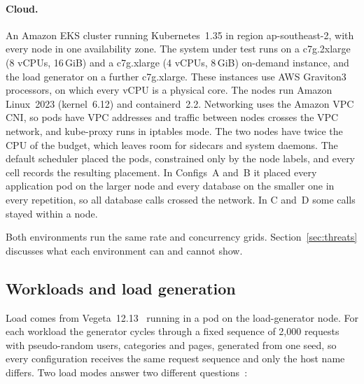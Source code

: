 \paragraph{Cloud.} An Amazon EKS cluster running Kubernetes~1.35 in region ap-southeast-2, with every node in
one availability zone. The system under test runs on a c7g.2xlarge (8 vCPUs, 16\,GiB) and a c7g.xlarge
(4 vCPUs, 8\,GiB) on-demand instance, and the load generator on a further c7g.xlarge. These instances use AWS
Graviton3 processors, on which every vCPU is a physical core. The nodes run Amazon Linux~2023 (kernel~6.12) and
containerd~2.2. Networking uses the Amazon VPC CNI, so pods have VPC addresses and traffic between nodes crosses
the VPC network, and kube-proxy runs in iptables mode. The two nodes have twice the CPU of the budget, which
leaves room for sidecars and system daemons. The default scheduler placed the pods, constrained only by the
node labels, and every cell records the resulting placement.
In Configs~A and~B it placed every application pod on the larger node and every database on the smaller one in
every repetition, so all database calls crossed the network. In C and~D some calls stayed within a node.

Both environments run the same rate and concurrency grids. Section~\ref{sec:threats} discusses what each
environment can and cannot show.

\subsection{Workloads and load generation}

Load comes from Vegeta~12.13~\cite{Vegeta} running in a pod on the load-generator node. For each workload the
generator cycles through a fixed sequence of 2{,}000 requests with pseudo-random users, categories and pages,
generated from one seed, so every configuration receives the same request sequence and only the host name
differs. Two load modes answer two different questions~\cite{Schroeder2006}:

